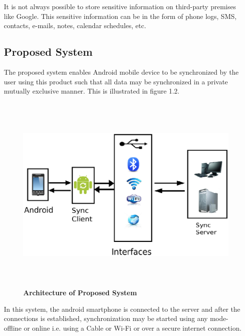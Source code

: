 It is not always possible to store sensitive information on third-party premises 
like Google. This sensitive information can be in the form of phone logs, SMS, 
contacts, e-mails, notes, calendar schedules, etc.

\subsection{Proposed System}
\hspace*{0.82cm}The proposed system enables Android mobile device to be synchronized by the user
using this product such that all data may be synchronized in a private mutually exclusive
manner. This is illustrated in figure 1.2.

\begin{figure}[H]
  \centering
    \includegraphics[height= 10cm, width=15cm]{project/images/architecture-proposed}
  \caption{\textbf{Architecture of Proposed System}}
\end{figure}

In this system, the android smartphone is connected to the server and after the
connections is established, synchronization may be started using any mode- offline or online
i.e. using a Cable or Wi-Fi or over a secure internet connection.